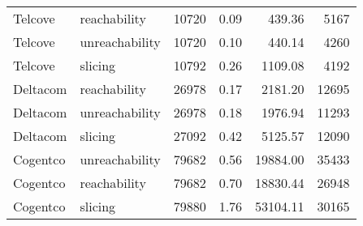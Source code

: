 \begin{tabular}{llrrrr}
Telcove & reachability & 10720 & 0.09 & 439.36 & 5167 \\
Telcove & unreachability & 10720 & 0.10 & 440.14 & 4260 \\
Telcove & slicing & 10792 & 0.26 & 1109.08 & 4192 \\
Deltacom & reachability & 26978 & 0.17 & 2181.20 & 12695 \\
Deltacom & unreachability & 26978 & 0.18 & 1976.94 & 11293 \\
Deltacom & slicing & 27092 & 0.42 & 5125.57 & 12090 \\
Cogentco & unreachability & 79682 & 0.56 & 19884.00 & 35433 \\
Cogentco & reachability & 79682 & 0.70 & 18830.44 & 26948 \\
Cogentco & slicing & 79880 & 1.76 & 53104.11 & 30165 \\
\bottomrule
\end{tabular}
